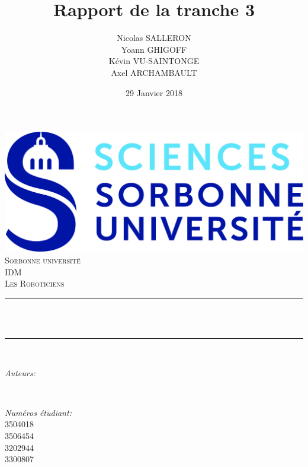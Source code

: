 \documentclass[12pt]{article}
\title{Rapport de la tranche 3}
\author{Nicolas SALLERON\\ Yoann GHIGOFF\\ Kévin VU-SAINTONGE \\ Axel ARCHAMBAULT}
\date{29 Janvier 2018}
\makeatletter
\let\thetitle\@title
\let\theauthor\@author
\let\thedate\@date
\makeatother
\begin{document}
\begin{titlepage}
	\centering
    \vspace*{0.5 cm}
    \includegraphics[scale = 0.10]{UPMC_Sorbonne_Universites_svg.jpg}\\[1.0 cm]	%
    \textsc{\LARGE Sorbonne université}\\[2.0 cm]	%
	\textsc{\LARGE IDM}\\[0.5 cm]			
	\textsc{\large Les Roboticiens}\\[0.5 cm]				%
	\rule{\linewidth}{0.2 mm} \\[0.4 cm]
	{ \huge \bfseries \thetitle}\\
	\rule{\linewidth}{0.2 mm} \\[1.5 cm]
	
	\begin{minipage}{0.4\textwidth}
		\begin{flushleft} \large
			\emph{Auteurs:}\\
			\theauthor
			\end{flushleft}
			\end{minipage}~
			\begin{minipage}{0.4\textwidth}
			\begin{flushright} \large
			\emph{Numéros étudiant:} \\
			3504018\\3506454\\3202944\\3300807									%
		\end{flushright}
	\end{minipage}\\[5 cm]
	
	{\large \thedate}\\[2 cm]
 
	\vfill
	
\end{titlepage}
\renewcommand{\contentsname}{Sommaire}
    \tableofcontents
    \newpage
\end{document}
